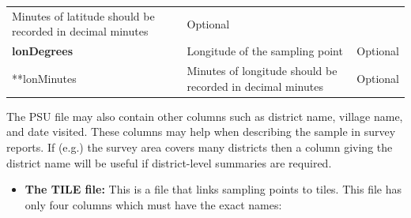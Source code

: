 \documentclass[12pt,a4paper]{book}
\providecommand{\tightlist}{%
  \setlength{\itemsep}{0pt}\setlength{\parskip}{0pt}}
\theoremstyle{definition}
\theoremstyle{definition}
\theoremstyle{definition}
\theoremstyle{remark}
\begin{document}
\begin{longtable}[]{@{}lll@{}}
\begin{minipage}[t]{0.36\columnwidth}
Minutes of latitude should be recorded in decimal minutes\strut
\end{minipage} & \begin{minipage}[t]{0.36\columnwidth}\raggedright
Optional\strut
\end{minipage}\tabularnewline
\begin{minipage}[t]{0.19\columnwidth}\raggedright
\textbf{lonDegrees}\strut
\end{minipage} & \begin{minipage}[t]{0.36\columnwidth}\raggedright
Longitude of the sampling point\strut
\end{minipage} & \begin{minipage}[t]{0.36\columnwidth}\raggedright
Optional\strut
\end{minipage}\tabularnewline
\begin{minipage}[t]{0.19\columnwidth}\raggedright
**lonMinutes\strut
\end{minipage} & \begin{minipage}[t]{0.36\columnwidth}\raggedright
Minutes of longitude should be recorded in decimal minutes\strut
\end{minipage} & \begin{minipage}[t]{0.36\columnwidth}\raggedright
Optional\strut
\end{minipage}\tabularnewline
\bottomrule
\end{longtable}

The PSU file may also contain other columns such as district name,
village name, and date visited. These columns may help when describing
the sample in survey reports. If (e.g.) the survey area covers many
districts then a column giving the district name will be useful if
district-level summaries are required.

\begin{itemize}
\tightlist
\item
  \textbf{The TILE file:} This is a file that links sampling points to
  tiles. This file has only four columns which must have the exact
  names:
\end{itemize}
\end{document}
